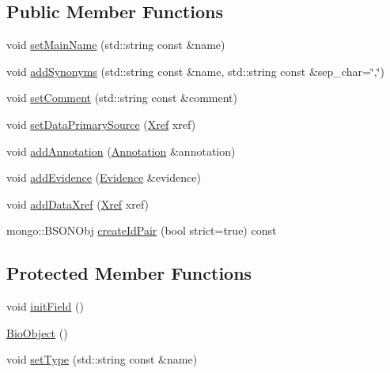 \subsection*{Public Member Functions}
\begin{DoxyCompactItemize}
\item 
void \hyperlink{classunisys_1_1BioObject_a97dbae52f1ae5e365ab0730c0562bdd5}{set\-Main\-Name} (std\-::string const \&name)
\item 
void \hyperlink{classunisys_1_1BioObject_a7acdd2ca1ecc7198626bc26966cfb060}{add\-Synonyms} (std\-::string const \&name, std\-::string const \&sep\-\_\-char=\char`\"{},\char`\"{})
\item 
void \hyperlink{classunisys_1_1BioObject_a4db890a15669daff7c5a4f69d524c4c1}{set\-Comment} (std\-::string const \&comment)
\item 
void \hyperlink{classunisys_1_1BioObject_a19ffdccbd63e7611da241cf4b2dac7db}{set\-Data\-Primary\-Source} (\hyperlink{classunisys_1_1Xref}{Xref} xref)
\item 
void \hyperlink{classunisys_1_1BioObject_a99510c967c71bb6c4ef8fa8399262563}{add\-Annotation} (\hyperlink{classunisys_1_1Annotation}{Annotation} \&annotation)
\item 
void \hyperlink{classunisys_1_1BioObject_a3b8e3f3b2cba8e545cb9ccdb45463078}{add\-Evidence} (\hyperlink{classunisys_1_1Evidence}{Evidence} \&evidence)
\item 
void \hyperlink{classunisys_1_1BioObject_a6016ee533dbd19f792ce1091e16865e6}{add\-Data\-Xref} (\hyperlink{classunisys_1_1Xref}{Xref} xref)
\item 
mongo\-::\-B\-S\-O\-N\-Obj \hyperlink{classunisys_1_1BioObject_a44d129aa979ef8a2d27b3afe1046f8af}{create\-Id\-Pair} (bool strict=true) const 
\end{DoxyCompactItemize}
\subsection*{Protected Member Functions}
\begin{DoxyCompactItemize}
\item 
void \hyperlink{classunisys_1_1BioObject_a0437fcc7976ff9e8dc5ce77246c06f71}{init\-Field} ()
\item 
\hyperlink{classunisys_1_1BioObject_a098ee2517786f5d909380771c94ae306}{Bio\-Object} ()
\item 
void \hyperlink{classunisys_1_1BioObject_a24d6362f074cf378024338c636744528}{set\-Type} (std\-::string const \&name)
\end{DoxyCompactItemize}
